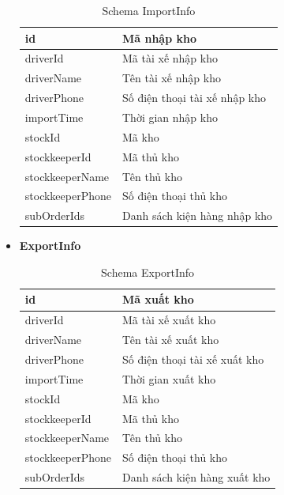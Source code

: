 \begin{itemize}
		\begin{table}[!htp]
			\centering\begin{tabular}{|l|m{30em}|}
				\hline 
				id & Mã nhập kho\\
				\hline 
				driverId & Mã tài xế nhập kho\\ 
				\hline
				driverName & Tên tài xế nhập kho \\
				\hline 
				driverPhone & Số điện thoại tài xế nhập kho \\
				\hline
				importTime & Thời gian nhập kho \\
				\hline
				stockId & Mã kho \\
				\hline
				stockkeeperId & Mã thủ kho \\
				\hline
				stockkeeperName & Tên thủ kho \\
				\hline
				stockkeeperPhone & Số điện thoại thủ kho \\
				\hline
				subOrderIds & Danh sách kiện hàng nhập kho \\
				\hline
			\end{tabular}
			\caption{Schema ImportInfo}
		\end{table}
	
	\newpage
	
	
		\item \textbf{ExportInfo}
		
		\begin{table}[!htp]
			\centering\begin{tabular}{|l|m{30em}|}
				\hline 
				id & Mã xuất kho\\
				\hline 
				driverId & Mã tài xế xuất kho\\ 
				\hline
				driverName & Tên tài xế xuất kho \\
				\hline 
				driverPhone & Số điện thoại tài xế xuất kho \\
				\hline
				importTime & Thời gian xuất kho \\
				\hline
				stockId & Mã kho \\
				\hline
				stockkeeperId & Mã thủ kho \\
				\hline
				stockkeeperName & Tên thủ kho \\
				\hline
				stockkeeperPhone & Số điện thoại thủ kho \\
				\hline
				subOrderIds & Danh sách kiện hàng xuất kho \\
				\hline
			\end{tabular}
			\caption{Schema ExportInfo}
		\end{table}


\end{itemize}
